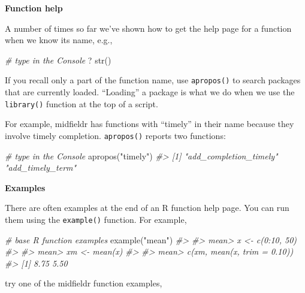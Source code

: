 \documentclass[
]{book}
\newenvironment{Shaded}{\begin{snugshade}}{\end{snugshade}}
\newcommand{\CommentTok}[1]{\textcolor[rgb]{0.56,0.35,0.01}{\textit{#1}}}
\newcommand{\FunctionTok}[1]{\textcolor[rgb]{0.00,0.00,0.00}{#1}}
\newcommand{\NormalTok}[1]{#1}
\newcommand{\StringTok}[1]{\textcolor[rgb]{0.31,0.60,0.02}{#1}}
\begin{document}
\textbf{Function help}

A number of times so far we've shown how to get the help page for a function when we know its name, e.g.,

\begin{Shaded}
\begin{Highlighting}[]
\CommentTok{\# type in the Console}
\NormalTok{? }\FunctionTok{str}\NormalTok{()}
\end{Highlighting}
\end{Shaded}

If you recall only a part of the function name, use \texttt{apropos()} to search packages that are currently loaded. ``Loading'' a package is what we do when we use the \texttt{library()} function at the top of a script.

For example, midfieldr has functions with ``timely'' in their name because they involve timely completion. \texttt{apropos()} reports two functions:

\begin{Shaded}
\begin{Highlighting}[]
\CommentTok{\# type in the Console}
\FunctionTok{apropos}\NormalTok{(}\StringTok{"timely"}\NormalTok{)}
\CommentTok{\#\textgreater{} [1] "add\_completion\_timely" "add\_timely\_term"}
\end{Highlighting}
\end{Shaded}

\textbf{Examples}

There are often examples at the end of an R function help page. You can run them using the \texttt{example()} function. For example,

\begin{Shaded}
\begin{Highlighting}[]
\CommentTok{\# base R function examples}
\FunctionTok{example}\NormalTok{(}\StringTok{"mean"}\NormalTok{)}
\CommentTok{\#\textgreater{} }
\CommentTok{\#\textgreater{} mean\textgreater{} x \textless{}{-} c(0:10, 50)}
\CommentTok{\#\textgreater{} }
\CommentTok{\#\textgreater{} mean\textgreater{} xm \textless{}{-} mean(x)}
\CommentTok{\#\textgreater{} }
\CommentTok{\#\textgreater{} mean\textgreater{} c(xm, mean(x, trim = 0.10))}
\CommentTok{\#\textgreater{} [1] 8.75 5.50}
\end{Highlighting}
\end{Shaded}

try one of the midfieldr function examples,
\end{document}
